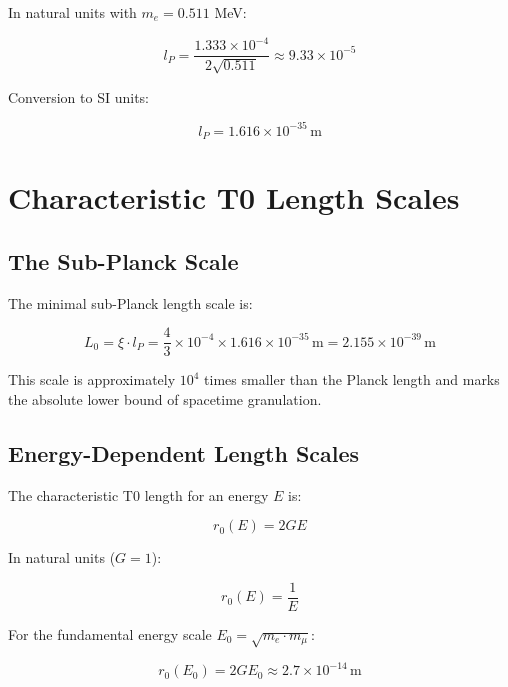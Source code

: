 In natural units with $m_e = 0.511$ MeV:

\begin{equation}
	l_P = \frac{1.333 \times 10^{-4}}{2\sqrt{0.511}} \approx 9.33 \times 10^{-5}
	\label{eq:planck_nat}
\end{equation}

Conversion to SI units:

\begin{equation}
	\boxed{l_P = 1.616 \times 10^{-35}\,\text{m}}
	\label{eq:planck_si}
\end{equation}

\section{Characteristic T0 Length Scales}

\subsection{The Sub-Planck Scale}

The minimal sub-Planck length scale is:

\begin{equation}
	L_0 = \xi \cdot l_P = \frac{4}{3} \times 10^{-4} \times 1.616 \times 10^{-35}\,\text{m} = 2.155 \times 10^{-39}\,\text{m}
	\label{eq:sub_planck}
\end{equation}

This scale is approximately $10^4$ times smaller than the Planck length and marks 
the absolute lower bound of spacetime granulation.

\subsection{Energy-Dependent Length Scales}

The characteristic T0 length for an energy $E$ is:

\begin{equation}
	r_0(E) = 2GE
	\label{eq:r0_energy}
\end{equation}

In natural units ($G = 1$):

\begin{equation}
	r_0(E) = \frac{1}{E}
	\label{eq:r0_natural}
\end{equation}

For the fundamental energy scale $E_0 = \sqrt{m_e \cdot m_\mu}$:

\begin{equation}
	r_0(E_0) = 2GE_0 \approx 2.7 \times 10^{-14}\,\text{m}
	\label{eq:r0_E0}
\end{equation}

